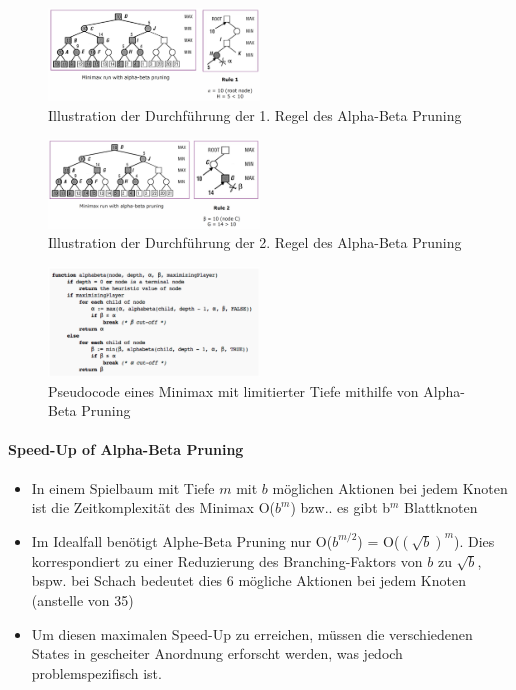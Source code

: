 \documentclass[a4paper]{article}
\begin{document}
		\begin{figure}[htb!]
			\centering
			\includegraphics[width=0.5\textwidth]{img/01_sequential_games/alphabeta_rule1.png}
			\caption{Illustration der Durchführung der 1. Regel des Alpha-Beta Pruning}
			\label{fig:01_seq_alphabeta_rule1}
		\end{figure}
	
		\begin{figure}[htb!]
			\centering
			\includegraphics[width=0.5\textwidth]{img/01_sequential_games/alphabeta_rule2.png}
			\caption{Illustration der Durchführung der 2. Regel des Alpha-Beta Pruning}
			\label{fig:01_seq_alphabeta_rule2}
		\end{figure}
	
		\begin{figure}[htb!]
			\centering
			\includegraphics[width=0.5\textwidth]{img/01_sequential_games/alphabeta_pseudocode.png}
			\caption{Pseudocode eines Minimax mit limitierter Tiefe mithilfe von Alpha-Beta Pruning}
			\label{fig:01_seq_alphabeta_pseudocode}
		\end{figure}
	
		\paragraph{Speed-Up of Alpha-Beta Pruning}
		
		\begin{itemize}
			\item In einem Spielbaum mit Tiefe $m$ mit $b$ möglichen Aktionen bei jedem Knoten ist die Zeitkomplexität des Minimax O($b^{m}$) bzw.. es gibt b$^{m}$ Blattknoten
			\item Im Idealfall benötigt Alphe-Beta Pruning nur O($b^{m/2}$) = O($(\sqrt{b})^{m}$). 
			Dies korrespondiert zu einer Reduzierung des Branching-Faktors von $b$ zu $\sqrt{b}$, bspw. bei Schach bedeutet dies 6 mögliche Aktionen bei jedem Knoten (anstelle von 35)
			\item Um diesen maximalen Speed-Up zu erreichen, müssen die verschiedenen States in gescheiter Anordnung erforscht werden, was jedoch problemspezifisch ist.
		\end{itemize}
	
\end{document}
